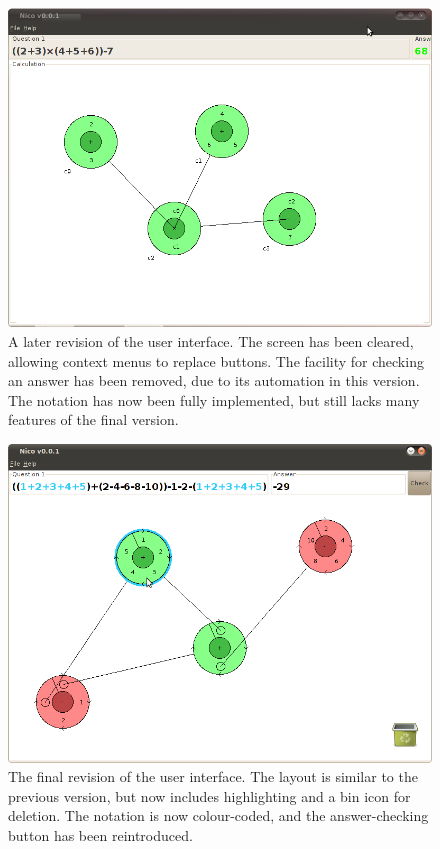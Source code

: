 \documentclass[12pt,twoside,notitlepage,xetex]{report}
\begin{document}
\begin{center}
\begin{figure}[H]
\begin{center}
\includegraphics[width=\textwidth-4cm]{figs/nico_screen_older.png}
\end{center}
\caption{A later revision of the user interface.  The screen has been cleared, allowing context menus to replace buttons.  The facility for checking an answer has been removed, due to its automation in this version.  The notation has now been fully implemented, but still lacks many features of the final version.}
\label{fig:OldApps2}
\end{figure}
\end{center}

\begin{center}
\begin{figure}[H]
\begin{center}
\includegraphics[width=\textwidth-4cm]{figs/nico_screen_new.png}
\end{center}
\caption{The final revision of the user interface.  The layout is similar to the previous version, but now includes highlighting and a bin icon for deletion.  The notation is now colour-coded, and the answer-checking button has been reintroduced.}
\label{fig:OldApps3}
\end{figure}
\end{center}
\end{document}
